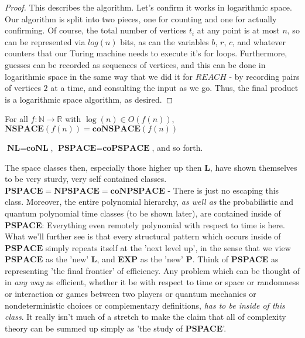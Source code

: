 \begin{proof}
    \par This describes the algorithm. Let's confirm it works in logarithmic space. Our algorithm is split into two pieces, one for counting and one for actually confirming. Of course, the total number of vertices $t_i$ at any point is at most $n$, so can be represented via $log(n)$ bits, as can the variables $b$, $r$, $c$, and whatever counters that our Turing machine needs to execute it's for loops. Furthermore, guesses can be recorded as sequences of vertices, and this can be done in logarithmic space in the same way that we did it for $REACH$ - by recording pairs of vertices $2$ at a time, and consulting the input as we go. Thus, the final product is a logarithmic space algorithm, as desired.
\end{proof}
\begin{corollary}
    For all $f: \mathbb{N} \to \mathbb{R}$ with $\log(n) \in O(f(n))$, $\textbf{NSPACE$(f(n))$} = \textbf{coNSPACE$(f(n))$}$
\end{corollary}
\begin{corollary}
    $\textbf{NL} = \textbf{coNL}$, $\textbf{PSPACE} = \textbf{coPSPACE}$, and so forth.
\end{corollary}
The space classes then, especially those higher up then $\textbf{L}$, have shown themselves to be very sturdy, very self contained classes. $\textbf{PSPACE} = \textbf{NPSPACE} = \textbf{coNPSPACE}$ - There is just no escaping this class. Moreover, the entire polynomial hierarchy, \textit{as well as } the probabilistic and quantum polynomial time classes (to be shown later), are contained inside of \textbf{PSPACE}: Everything even remotely polynomial with respect to time is here. What we'll further see is that every structural pattern which occurs inside of $\textbf{PSPACE}$ simply repeats itself at the 'next level up', in the sense that we view $\textbf{PSPACE}$ as the 'new' \textbf{L}, and \textbf{EXP} as the 'new' \textbf{P}. Think of \textbf{PSPACE} as representing 'the final frontier' of efficiency. Any problem which can be thought of in \textit{any way} as efficient, whether it be with respect to time or space or randomness or interaction or games between two players or quantum mechanics or nondeterministic choices or complementary definitions, \textit{has to be inside of this class}. It really isn't much of a stretch to make the claim that all of complexity theory can be summed up simply as 'the study of \textbf{PSPACE}'.

